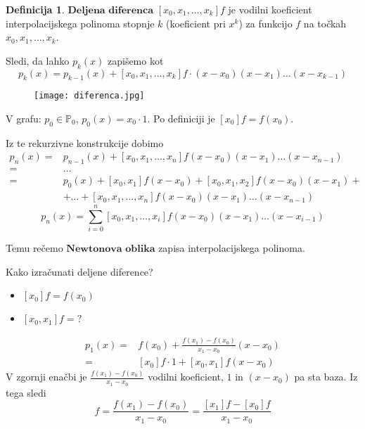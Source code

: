 \documentclass[a4paper,12pt]{article}
\theoremstyle{definition}
\newtheorem{defn}[counter]{Definicija}
\theoremstyle{remark}
\newcommand{\Pp}{\mathbb{P}}
\begin{document}
\begin{defn}
    $\textbf{Deljena diferenca}$  $[x_0, x_1, \dots, x_k] f$ je vodilni koeficient interpolacijskega polinoma stopnje $k$ (koeficient pri $x^k$) za funkcijo $f$ na
    točkah $x_0, x_1, \dots, x_k$.
\end{defn}

Sledi, da lahko $p_k(x)$ zapišemo kot
\begin{equation*}
    p_k(x) = p_{k-1}(x) + [x_0, x_1, \dots, x_k]f \cdot (x-x_0)(x-x_1) \dots (x-x_{k-1})
\end{equation*}

\begin{figure}[H]
    \center
    \texttt{[image: diferenca.jpg]}
\end{figure}

V grafu: $p_0 \in \Pp_0$, $p_0(x) = x_0 \cdot 1$.
Po definiciji je $[x_0]f = f(x_0)$.

Iz te rekurzivne konstrukcije dobimo
\begin{align*}
    p_n(x) = & p_{n-1}(x) + [x_0, x_1, \dots, x_n] f (x-x_0)(x-x_1) \dots (x-x_{n-1}) \\
           = & \dots \\
           = & p_0(x) + [x_0, x_1] f (x-x_0) + [x_0, x_1, x_2] f (x-x_0)(x-x_1) + \\
            & + \dots + [x_0, x_1, \dots, x_n] f (x-x_0)(x-x_1) \dots (x-x_{n-1})
\end{align*}
\begin{equation*}
    p_n(x) = \sum_{i = 0}^{n}[x_0, x_1, \dots, x_i] f (x-x_0)(x-x_1)\dots(x-x_{i-1})
\end{equation*}

Temu rečemo $\textbf{Newtonova oblika}$ zapisa interpolacijskega polinoma.

Kako izračunati deljene diference?

\begin{itemize}
    \item $[x_0] f = f(x_0)$
    \item $[x_0, x_1] f = \text{?}$
\end{itemize}


\begin{align*}
    p_1 (x) =& f(x_0) + \frac{f(x_1)- f(x_0)}{x_1 - x_0} (x-x_0) \\
            =& [x_0] f \cdot 1 + [x_0, x_1] f (x-x_0)
\end{align*}
V zgornji enačbi je $\frac{f(x_1)- f(x_0)}{x_1 - x_0}$ vodilni koeficient, $1$ in $(x-x_0)$ pa sta baza. Iz tega sledi
\begin{equation*}
    [x_0, x_1] f = \frac{f(x_1)- f(x_0)}{x_1 - x_0} = \frac{[x_1]f - [x_0]f}{x_1 - x_0}    
\end{equation*}
\end{document}
